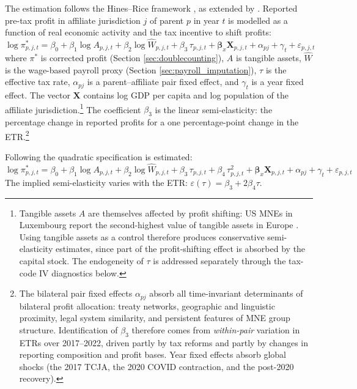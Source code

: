 \documentclass[11pt,a4paper]{article}
\begin{document}
The estimation follows the Hines--Rice framework \citep{hines1994}, as extended by \citet{garcia-bernardo2024}. Reported pre-tax profit in affiliate jurisdiction $j$ of parent $p$ in year $t$ is modelled as a function of real economic activity and the tax incentive to shift profits:
\begin{equation}\label{eq:panel_linear}
\log \pi_{p,j,t}^{*} = \beta_0 + \beta_1 \log A_{p,j,t} + \beta_2 \log \hat{W}_{p,j,t} + \beta_3 \, \tau_{p,j,t} + \mathbf{\beta}_x \mathbf{X}_{p,j,t} + \alpha_{pj} + \gamma_t + \varepsilon_{p,j,t}
\end{equation}
where $\pi^{*}$ is corrected profit (Section \ref{sec:doublecounting}), $A$ is tangible assets, $\hat{W}$ is the wage-based payroll proxy (Section \ref{sec:payroll_imputation}), $\tau$ is the effective tax rate, $\alpha_{pj}$ is a parent--affiliate pair fixed effect, and $\gamma_t$ is a year fixed effect. The vector $\mathbf{X}$ contains log GDP per capita and log population of the affiliate jurisdiction.\footnote{Tangible assets $A$ are themselves affected by profit shifting: US MNEs in Luxembourg report the second-highest value of tangible assets in Europe \citep{garcia-bernardo2024}. Using tangible assets as a control therefore produces conservative semi-elasticity estimates, since part of the profit-shifting effect is absorbed by the capital stock. The endogeneity of $\tau$ is addressed separately through the tax-code IV diagnostics below.} The coefficient $\beta_3$ is the linear semi-elasticity: the percentage change in reported profits for a one percentage-point change in the ETR.\footnote{The bilateral pair fixed effects $\alpha_{pj}$ absorb all time-invariant determinants of bilateral profit allocation: treaty networks, geographic and linguistic proximity, legal system similarity, and persistent features of MNE group structure. Identification of $\beta_3$ therefore comes from \emph{within-pair} variation in ETRs over 2017--2022, driven partly by tax reforms and partly by changes in reporting composition and profit bases. Year fixed effects absorb global shocks (the 2017 TCJA, the 2020 COVID contraction, and the post-2020 recovery).}

Following \citet{dowd2017} the quadratic specification is estimated:
\begin{equation}\label{eq:panel_quadratic}
\log \pi_{p,j,t}^{*} = \beta_0 + \beta_1 \log A_{p,j,t} + \beta_2 \log \hat{W}_{p,j,t} + \beta_3 \, \tau_{p,j,t} + \beta_4 \, \tau_{p,j,t}^2 + \mathbf{\beta}_x \mathbf{X}_{p,j,t} + \alpha_{pj} + \gamma_t + \varepsilon_{p,j,t}
\end{equation}
The implied semi-elasticity varies with the ETR: $\varepsilon(\tau) = \beta_3 + 2\beta_4 \tau$.
\end{document}
